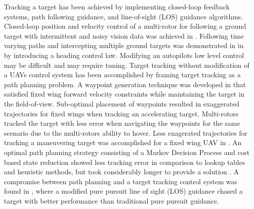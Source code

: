 \documentclass[conference]{IEEEtran}
\begin{document}
Tracking a target has been achieved by implementing closed-loop feedback systems, path following guidance, and line-of-sight (LOS) guidance algorithms. Closed-loop position and velocity control of a multi-rotor for following a ground target with intermittent and noisy vision data was achieved in \cite{teuliere_chasing_2011}. Following time varying paths and intercepting multiple ground targets was demonstrated in in \cite{oliveira_moving_2016} by introducing a heading control law. Modifying an autopilots low level control may be difficult and may require tuning.
Target tracking without modification of a UAVs control system has been accomplished by framing target tracking as a path planning problem. A waypoint generation technique was developed in \cite{ariyur_autonomous_2008} that satisfied fixed wing forward velocity constraints while maintaining the target in the field-of-view. Sub-optimal placement of waypoints resulted in exaggerated trajectories for fixed wings when tracking an accelerating target. Multi-rotors tracked the target with less error when navigating the waypoints for the same scenario due to the multi-rotors ability to hover. Less exagerated trajectories for tracking a maneuvering target was accomplished for a fixed wing UAV in \cite{lee_strategies_2003}. An optimal path planning strategy consisting of a Markov Decision Process and cost based state reduction showed less tracking error in comparison to lookup tables and heuristic methods, but took considerably longer to provide a solution \cite{baek_optimal_2013}. A compromise between path planning and a target tracking control system was found in \cite{yamasaki_advanced_2009}, where a modified pure pursuit line of sight (LOS) guidance chased a target with better performance than traditional pure pursuit guidance\cite{yamasaki_advanced_2009}. 
\end{document}
